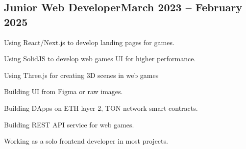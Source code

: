 \subsection{{Junior Web Developer\hfill March 2023 -- February 2025}}
\begin{zitemize}
\item Using React/Next.js to develop landing pages for games.
\item Using SolidJS to develop web games UI for higher performance.
\item Using Three.js for creating 3D scenes in web games
\item Building UI from Figma or raw images.
\item Building DApps on ETH layer 2, TON network smart contracts.
\item Building REST API service for web games.
\item Working as a solo frontend developer in most projects.
\end{zitemize}



